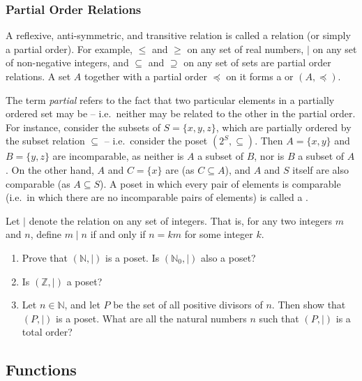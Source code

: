 \subsubsection{Partial Order Relations}

A reflexive, anti-symmetric, and transitive relation is called a  relation (or simply a partial order). For example, $\le$ and $\ge$ on any set of real numbers, $\mid$ on any set of non-negative integers, and $\subseteq$ and $\supseteq$ on any set of sets are partial order relations. A set $A$ together with a partial order $\preccurlyeq$ on it forms a  or  $(A, \preccurlyeq)$.

\begin{Note*}
The term \emph{partial} refers to the fact that two particular elements in a partially ordered set may be  -- i.e.\ neither may be related to the other in the partial order. For instance, consider the subsets of $S = \{x, y, z\}$, which are partially ordered by the subset relation $\subseteq$ -- i.e.\ consider the poset $(2^S, \subseteq)$. Then $A = \{x, y\}$ and $B =\{y, z\}$ are incomparable, as neither is $A$ a subset of $B$, nor is $B$ a subset of $A$. On the other hand, $A$ and $C = \{x\}$ are  (as $C \subseteq A$), and $A$ and $S$ itself are also comparable (as $A \subseteq S$). A poset in which every pair of elements is comparable (i.e.\ in which there are no incomparable pairs of elements) is called a .
\end{Note*}

\begin{Exercise}\label{exer:DividesRel}
Let $\mid$ denote the  relation on any set of integers. That is, for any two integers $m$ and $n$, define $m \mid n$ if and only if $n = km$ for some integer $k$.
\begin{enumerate}
\item Prove that $(\mathbb N, \mid)$ is a poset. Is $(\mathbb N_0, \mid)$ also a poset?
\item Is $(\mathbb Z, \mid)$ a poset?
\item Let $n \in \mathbb N$, and let $P$ be the set of all positive divisors of $n$. Then show that $(P, \mid)$ is a poset. What are all the natural numbers $n$ such that $(P, \mid)$ is a total order?
\end{enumerate}
\end{Exercise}

\subsection{Functions}\label{subsec:Functions}

